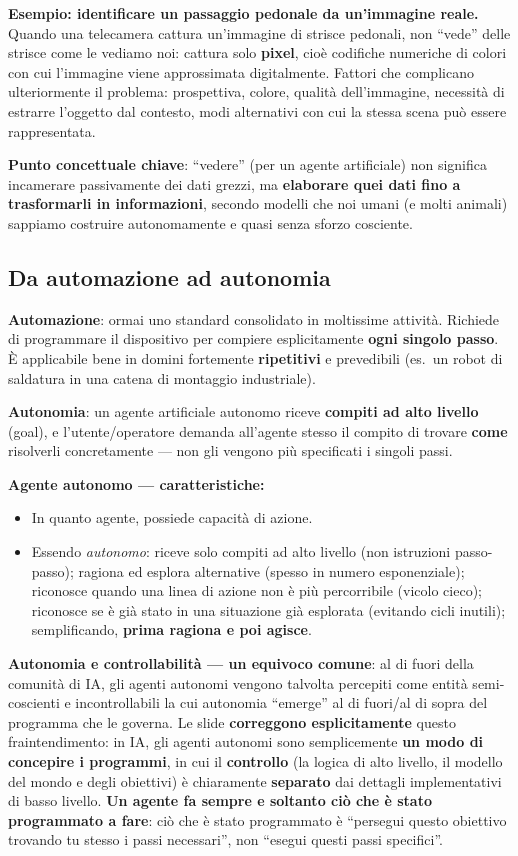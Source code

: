 \documentclass[11pt,a4paper]{report}
\begin{document}
\textbf{Esempio: identificare un passaggio pedonale da un'immagine reale.} Quando una telecamera cattura un'immagine di strisce pedonali, non ``vede'' delle strisce come le vediamo noi: cattura solo \textbf{pixel}, cioè codifiche numeriche di colori con cui l'immagine viene approssimata digitalmente. Fattori che complicano ulteriormente il problema: prospettiva, colore, qualità dell'immagine, necessità di estrarre l'oggetto dal contesto, modi alternativi con cui la stessa scena può essere rappresentata.

\textbf{Punto concettuale chiave}: ``vedere'' (per un agente artificiale) non significa incamerare passivamente dei dati grezzi, ma \textbf{elaborare quei dati fino a trasformarli in informazioni}, secondo modelli che noi umani (e molti animali) sappiamo costruire autonomamente e quasi senza sforzo cosciente.

\subsection{Da automazione ad autonomia}

\textbf{Automazione}: ormai uno standard consolidato in moltissime attività. Richiede di programmare il dispositivo per compiere esplicitamente \textbf{ogni singolo passo}. È applicabile bene in domini fortemente \textbf{ripetitivi} e prevedibili (es.\ un robot di saldatura in una catena di montaggio industriale).

\textbf{Autonomia}: un agente artificiale autonomo riceve \textbf{compiti ad alto livello} (goal), e l'utente/operatore demanda all'agente stesso il compito di trovare \textbf{come} risolverli concretamente --- non gli vengono più specificati i singoli passi.

\textbf{Agente autonomo --- caratteristiche:}
\begin{itemize}
  \item In quanto agente, possiede capacità di azione.
  \item Essendo \emph{autonomo}: riceve solo compiti ad alto livello (non istruzioni passo-passo); ragiona ed esplora alternative (spesso in numero esponenziale); riconosce quando una linea di azione non è più percorribile (vicolo cieco); riconosce se è già stato in una situazione già esplorata (evitando cicli inutili); semplificando, \textbf{prima ragiona e poi agisce}.
\end{itemize}

\textbf{Autonomia e controllabilità --- un equivoco comune}: al di fuori della comunità di IA, gli agenti autonomi vengono talvolta percepiti come entità semi-coscienti e incontrollabili la cui autonomia ``emerge'' al di fuori/al di sopra del programma che le governa. Le slide \textbf{correggono esplicitamente} questo fraintendimento: in IA, gli agenti autonomi sono semplicemente \textbf{un modo di concepire i programmi}, in cui il \textbf{controllo} (la logica di alto livello, il modello del mondo e degli obiettivi) è chiaramente \textbf{separato} dai dettagli implementativi di basso livello. \textbf{Un agente fa sempre e soltanto ciò che è stato programmato a fare}: ciò che è stato programmato è ``persegui questo obiettivo trovando tu stesso i passi necessari'', non ``esegui questi passi specifici''.
\end{document}
